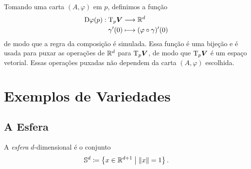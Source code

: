 Tomando uma carta $(A,\varphi)$ em $p$, definimos a função
	\begin{align*}
	{\mathrm{D}\varphi(p)}: {\mathrm{T}_p \bm V} &\longrightarrow {\mathbb{R}^d} \\{\gamma'(0)} &\longmapsto {(\varphi \circ \gamma)'(0)}
	\end{align*}
de modo que a regra da composição é simulada. Essa função é uma bijeção e é usada para puxar as operações de $\mathbb{R}^d$ para $\mathrm{T}_p \bm V$, de modo que $\mathrm{T}_p \bm V$ é um espaço vetorial. Essas operações puxadas não dependem da carta $(A,\varphi)$ escolhida.






























\cleardoublepage





\section{Exemplos de Variedades}

\subsection{A Esfera}

\begin{defi}
A \emph{esfera} $d$-dimensional é o conjunto
	\begin{equation*}
	\mathbb{S}^d \coloneqq \left\{x \in \mathbb{R}^{d+1} \;\middle\vert\; \left\Vert{x}\right\Vert=1 \right\}.
	\end{equation*}
\end{defi}

